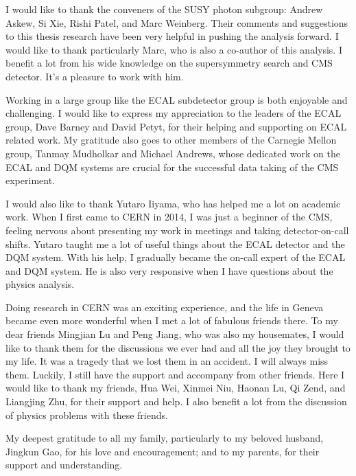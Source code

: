 \documentclass[12pt,oneside]{memoir}
\begin{document}
I would like to thank the conveners of the SUSY photon subgroup: Andrew Askew, Si Xie, Rishi Patel, and Marc Weinberg. Their comments and suggestions to this thesis research have been very helpful in pushing the analysis forward. I would like to thank particularly Marc, who is also a co-author of this analysis. I benefit a lot from his wide knowledge on the supersymmetry search and CMS detector. It's a pleasure to work with him.  

Working in a large group like the ECAL subdetector group is both enjoyable and challenging. I would like to express my appreciation to the leaders of the ECAL group, Dave Barney and David Petyt, for their helping and supporting on ECAL related work. My gratitude also goes to other members of the Carnegie Mellon group, Tanmay Mudholkar and Michael Andrews, whose dedicated work on the ECAL and DQM systems are crucial for the successful data taking of the CMS experiment.  

I would also like to thank Yutaro Iiyama, who has helped me a lot on academic work. When I first came to CERN in 2014, I was just a beginner of the CMS, feeling nervous about presenting my work in meetings and taking detector-on-call shifts. Yutaro taught me a lot of useful things about the ECAL detector and the DQM system. With his help, I gradually became the on-call expert of the ECAL and DQM system. He is also very responsive when I have questions about the physics analysis. 

Doing research in CERN was an exciting experience, and the life in Geneva became even more wonderful when I met a lot of fabulous friends there. 
To my dear friends Mingjian Lu and Peng Jiang, who was also my housemates, I would like to thank them for the discussions we ever had and all the joy they brought to my life. 
It was a tragedy that we lost them in an accident. I will always miss them. 
Luckily, I still have the support and accompany from other friends. 
Here I would like to thank my friends, Hua Wei, Xinmei Niu, Haonan Lu, Qi Zend, and Liangjing Zhu, for their support and help. 
I also benefit a lot from the discussion of physics problems with these friends. 

My deepest gratitude to all my family, particularly to my beloved husband, Jingkun Gao, for his love and encouragement; and to my parents, for their support and understanding.  


\newpage
\tableofcontents
\listoftables
\listoffigures

\clearpage 
\end{document}
